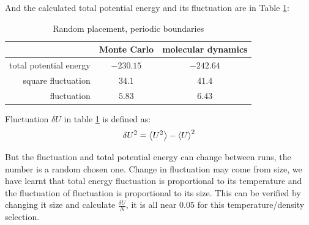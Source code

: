 \documentclass[UTF8,a4paper]{article}
\begin{document}
And the calculated total potential energy and its fluctuation are in Table \ref{tab:rand1}:
\begin{table}[H]
	\centering
	\caption{Random placement, periodic boundaries}
	\begin{tabular}{rcc}
		\toprule
		\toprule
		                       & Monte Carlo & molecular dynamics \\ \midrule
		total potential energy & $-230.15$   & $-242.64$          \\
		square fluctuation     & $34.1$      & $41.4$             \\
		fluctuation            & $5.83$      & $6.43$             \\
		\bottomrule
	\end{tabular}%
	\label{tab:rand1}%
\end{table}%
Fluctuation $\delta U$ in table \ref{tab:rand1} is defined as:
\begin{equation}
	\delta U^{2}=\expval{U^2} - \expval{U}^2	\label{eq:flu}
\end{equation}

But the fluctuation and total potential energy can change between runs, the number is a random chosen one. Change in fluctuation may come from size,
we have learnt that total energy fluctuation is proportional to its temperature and the fluctuation of fluctuation is proportional to its size.
This can be verified by changing it size and calculate $\frac{\delta U}{N}$,
it is all near $0.05$ for this temperature/density selection.
\end{document}

